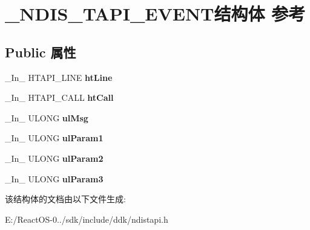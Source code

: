 \hypertarget{struct___n_d_i_s___t_a_p_i___e_v_e_n_t}{}\section{\+\_\+\+N\+D\+I\+S\+\_\+\+T\+A\+P\+I\+\_\+\+E\+V\+E\+N\+T结构体 参考}
\label{struct___n_d_i_s___t_a_p_i___e_v_e_n_t}
\subsection*{Public 属性}
\begin{DoxyCompactItemize}
\item 
\mbox{\label{struct___n_d_i_s___t_a_p_i___e_v_e_n_t_a082430048a41951aa619f2976732619d}} 
\+\_\+\+In\+\_\+ H\+T\+A\+P\+I\+\_\+\+L\+I\+NE {\bfseries ht\+Line}
\item 
\mbox{\label{struct___n_d_i_s___t_a_p_i___e_v_e_n_t_a78af2f0923e4ace017a8a2c228a08f4f}} 
\+\_\+\+In\+\_\+ H\+T\+A\+P\+I\+\_\+\+C\+A\+LL {\bfseries ht\+Call}
\item 
\mbox{\label{struct___n_d_i_s___t_a_p_i___e_v_e_n_t_a74eb03348e817b54c35036d276ffc148}} 
\+\_\+\+In\+\_\+ U\+L\+O\+NG {\bfseries ul\+Msg}
\item 
\mbox{\label{struct___n_d_i_s___t_a_p_i___e_v_e_n_t_af05458e73b1b26d8648181c3827c867a}} 
\+\_\+\+In\+\_\+ U\+L\+O\+NG {\bfseries ul\+Param1}
\item 
\mbox{\label{struct___n_d_i_s___t_a_p_i___e_v_e_n_t_ae13bb2a607b4e3810df0e9d3f1a33d78}} 
\+\_\+\+In\+\_\+ U\+L\+O\+NG {\bfseries ul\+Param2}
\item 
\mbox{\label{struct___n_d_i_s___t_a_p_i___e_v_e_n_t_ab61031fe595fdd0ec9765ea2466fcee7}} 
\+\_\+\+In\+\_\+ U\+L\+O\+NG {\bfseries ul\+Param3}
\end{DoxyCompactItemize}


该结构体的文档由以下文件生成\+:\begin{DoxyCompactItemize}
\item 
E\+:/\+React\+O\+S-\/0../sdk/include/ddk/ndistapi.\+h\end{DoxyCompactItemize}
